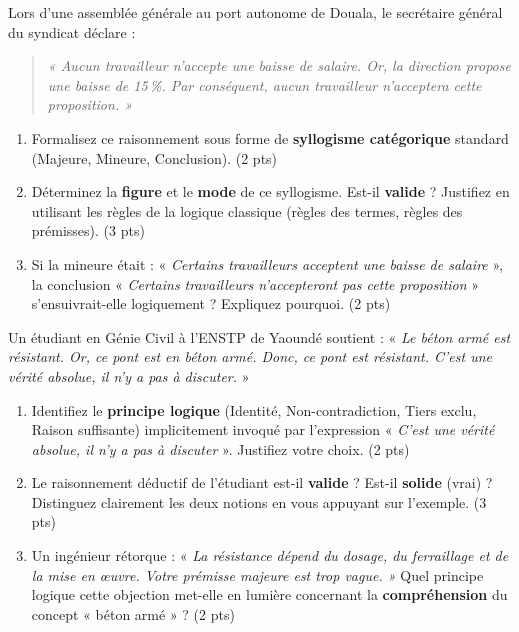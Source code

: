 \documentclass[11pt]{article}
\begin{document}
\begin{exercice}
Lors d'une assemblée générale au port autonome de Douala, le secrétaire général du syndicat déclare : 
\begin{quote}
\textit{« Aucun travailleur n'accepte une baisse de salaire. Or, la direction propose une baisse de 15\,\%. Par conséquent, aucun travailleur n'acceptera cette proposition. »}
\end{quote}
\begin{enumerate}
    \item Formalisez ce raisonnement sous forme de \textbf{syllogisme catégorique} standard (Majeure, Mineure, Conclusion). (2 pts)
    \item Déterminez la \textbf{figure} et le \textbf{mode} de ce syllogisme. Est-il \textbf{valide} ? Justifiez en utilisant les règles de la logique classique (règles des termes, règles des prémisses). (3 pts)
    \item Si la mineure était : « \textit{Certains travailleurs acceptent une baisse de salaire} », la conclusion « \textit{Certains travailleurs n'accepteront pas cette proposition} » s'ensuivrait-elle logiquement ? Expliquez pourquoi. (2 pts)
\end{enumerate}
\end{exercice}

\begin{exercice}
Un étudiant en Génie Civil à l'ENSTP de Yaoundé soutient : « \textit{Le béton armé est résistant. Or, ce pont est en béton armé. Donc, ce pont est résistant. C'est une vérité absolue, il n'y a pas à discuter.} »
\begin{enumerate}
    \item Identifiez le \textbf{principe logique} (Identité, Non-contradiction, Tiers exclu, Raison suffisante) implicitement invoqué par l'expression « \textit{C'est une vérité absolue, il n'y a pas à discuter} ». Justifiez votre choix. (2 pts)
    \item Le raisonnement déductif de l'étudiant est-il \textbf{valide} ? Est-il \textbf{solide} (vrai) ? Distinguez clairement les deux notions en vous appuyant sur l'exemple. (3 pts)
    \item Un ingénieur rétorque : « \textit{La résistance dépend du dosage, du ferraillage et de la mise en œuvre. Votre prémisse majeure est trop vague. »} Quel principe logique cette objection met-elle en lumière concernant la \textbf{compréhension} du concept « béton armé » ? (2 pts)
\end{enumerate}
\end{exercice}
\end{document}
